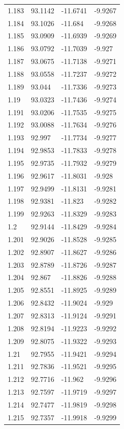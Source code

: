 \begin{tabular}{llll}
1.183 & 93.1142 & -11.6741 & -9.9267 \\
1.184 & 93.1026 & -11.684 & -9.9268 \\
1.185 & 93.0909 & -11.6939 & -9.9269 \\
1.186 & 93.0792 & -11.7039 & -9.927 \\
1.187 & 93.0675 & -11.7138 & -9.9271 \\
1.188 & 93.0558 & -11.7237 & -9.9272 \\
1.189 & 93.044 & -11.7336 & -9.9273 \\
1.19 & 93.0323 & -11.7436 & -9.9274 \\
1.191 & 93.0206 & -11.7535 & -9.9275 \\
1.192 & 93.0088 & -11.7634 & -9.9276 \\
1.193 & 92.997 & -11.7734 & -9.9277 \\
1.194 & 92.9853 & -11.7833 & -9.9278 \\
1.195 & 92.9735 & -11.7932 & -9.9279 \\
1.196 & 92.9617 & -11.8031 & -9.928 \\
1.197 & 92.9499 & -11.8131 & -9.9281 \\
1.198 & 92.9381 & -11.823 & -9.9282 \\
1.199 & 92.9263 & -11.8329 & -9.9283 \\
1.2 & 92.9144 & -11.8429 & -9.9284 \\
1.201 & 92.9026 & -11.8528 & -9.9285 \\
1.202 & 92.8907 & -11.8627 & -9.9286 \\
1.203 & 92.8789 & -11.8726 & -9.9287 \\
1.204 & 92.867 & -11.8826 & -9.9288 \\
1.205 & 92.8551 & -11.8925 & -9.9289 \\
1.206 & 92.8432 & -11.9024 & -9.929 \\
1.207 & 92.8313 & -11.9124 & -9.9291 \\
1.208 & 92.8194 & -11.9223 & -9.9292 \\
1.209 & 92.8075 & -11.9322 & -9.9293 \\
1.21 & 92.7955 & -11.9421 & -9.9294 \\
1.211 & 92.7836 & -11.9521 & -9.9295 \\
1.212 & 92.7716 & -11.962 & -9.9296 \\
1.213 & 92.7597 & -11.9719 & -9.9297 \\
1.214 & 92.7477 & -11.9819 & -9.9298 \\
1.215 & 92.7357 & -11.9918 & -9.9299 \\

\end{tabular}
